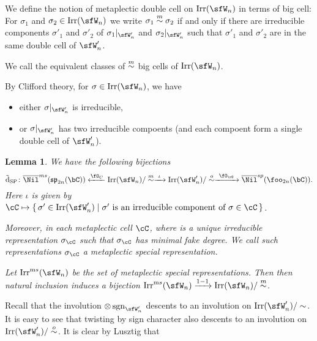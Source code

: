 \documentclass[12pt,a4paper]{amsart}
\def\fsp{\mathfrak{sp}}
\def\fso{\mathfrak{so}}
\newcommand{\sgn}{\operatorname{sgn}}
\numberwithin{equation}{section}
\newtheorem{lem}[thm]{Lemma}
\theoremstyle{remark}
\def\tdSP{\tilde{\mathrm{d}}_{\mathrm{SP}}}
\begin{document}
We define the notion of metaplectic double cell on $\Irr(\sfW_{n})$ in terms of
big cell:
For $\sigma_{1}$ and $\sigma_{2}\in \Irr(\sfW_{n})$ we write $\sigma_{1}\stackrel{m}{\sim} \sigma_{2}$
if and only if there are irreducible components
$\sigma'_{1}$ and $\sigma'_{2}$ of
$\sigma_{1}|_{\sfW'_{n}}$ and $\sigma_{2}|_{\sfW'_{n}}$ such that $\sigma'_{1}$
and $\sigma'_{2}$ are in the same double cell of $\sfW'_{n}$.


We call the equivalent classes of $\stackrel{m}{\sim}$ big cells of $\Irr(\sfW_{n})$.

By Clifford theory, for $\sigma\in \Irr(\sfW_{n})$, we have
\begin{itemize}
        \item
either $\sigma|_{\sfW'_{n}}$ is
        irreducible,
        \item or $\sigma|_{\sfW'_{n}}$ has two irreducible compoents (and each
        compoent form a single double cell of $\sfW'_{n}$).
\end{itemize}


\begin{lem}
  We have the following bijections
  \[
  \tdSP \colon
    \bNil^{ms}(\fsp_{2n}(\bC))\xleftarrow{\Springer_{C}} \Irr(\sfW_{n})/\msim \xrightarrow{\ \iota \ } \Irr(\sfW'_{n})/\osim \xrightarrow{\ \SpringerO \ } \bNil^{sp}(\foo_{2n}(\bC)).
  \]
  Here $\iota$ is given by $\cC\mapsto \set{\sigma'\in \Irr(\sfW'_{n})| \text{$\sigma'$ is an
      irreducible component of $\sigma\in \cC$}}$.

  Moreover, in each metaplectic cell $\cC$, where is a unique irreducible
  representation $\sigma_{\cC}$ such that $\sigma_{\cC}$ has minimal fake
  degree. We call such representations $\sigma_{\cC}$ a metaplectic special
  representation.

  Let $\Irrms(\sfW_{n})$ be the set of metaplectic special representations.
  Then then natural inclusion induces a bijection
  $\Irrms(\sfW_{n})\xrightarrow{1-1} \Irr(\sfW_{n})/\msim$.
\end{lem}

Recall that the involution $\otimes \sgn_{\sfW'_{n}}$ descents to an involution
on $\Irr(\sfW'_{n})/\sim$.
It is easy to see that twisting by sign character also descents to an
involution on $\Irr(\sfW'_{n})/\osim$.
It is clear by Lusztig that
\end{document}
